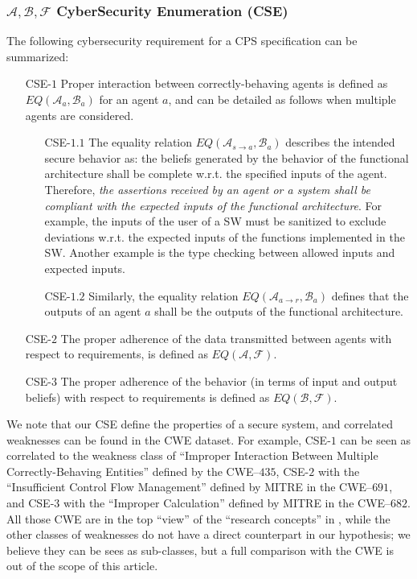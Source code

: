 \documentclass[conference]{IEEEtran}
\newcommand{\assertionRegion}{\mathcal{A}}
\newcommand{\beliefRegion}{\mathcal{B}}
\newcommand{\factRegion}{\mathcal{F}}
\newcommand{\abf}{\assertionRegion,\beliefRegion,\factRegion}
\newcommand{\eq}[2]{EQ(#1,#2)}
\begin{document}
\subsubsection{$\abf$ CyberSecurity Enumeration (CSE)} The following cybersecurity
requirement for a CPS specification can be summarized:
\begin{enumerate}
	\item[CSE-$1$] Proper interaction between correctly-behaving agents is
		defined as $\eq{\assertionRegion_a}{\beliefRegion_a}$ for an
		agent $a$, and can be detailed as follows when multiple agents
		are considered.
	\begin{enumerate}
		\item[CSE-$1.1$] The equality relation
			$\eq{\assertionRegion_{s\rightarrow
			a}}{\beliefRegion_a}$ describes the intended secure
			behavior as: the beliefs generated by the behavior of
			the functional architecture shall be complete w.r.t.
			the specified inputs of the agent. Therefore, \emph{the
			assertions received by an agent or a system shall be
			compliant with the expected inputs of the functional
			architecture}. For example, the inputs of the user of a
			SW must be sanitized to exclude deviations w.r.t. the
			expected inputs of the functions implemented in the SW.
			Another example is the type checking between allowed
			inputs and expected inputs.
		\item[CSE-$1.2$] Similarly, the equality relation
			$\eq{\assertionRegion_{a\rightarrow
			r}}{\beliefRegion_a}$ defines that the outputs of an
			agent $a$ shall be the outputs of the functional
			architecture.
	\end{enumerate}
\item[CSE-$2$] The proper adherence of the data transmitted between agents with respect to
	requirements, is defined as $\eq{\assertionRegion}{\factRegion}$. 
\item[CSE-$3$] The proper adherence of the behavior (in terms of input and output beliefs) with respect to
		requirements is defined as $\eq{\beliefRegion}{\factRegion}$.
\end{enumerate}

We note that our CSE define the properties of a secure system, and correlated
weaknesses can be found in the CWE dataset.  For example, CSE-$1$ can be seen as
correlated to the weakness class of ``Improper Interaction Between Multiple
Correctly-Behaving Entities'' defined by the CWE--$435$, CSE-$2$ with the
``Insufficient Control Flow Management'' defined by MITRE in the CWE--$691$,
and CSE-$3$ with the ``Improper Calculation'' defined by MITRE in the
CWE--$682$. All those CWE are in the top ``view'' of the ``research concepts''
in \autocite{MITRE2020CWEresearch}, while the other classes of weaknesses do not
have a direct counterpart in our hypothesis; we believe they can be sees as sub-classes,
but a full comparison with the CWE is out of the scope of this article.
\end{document}
